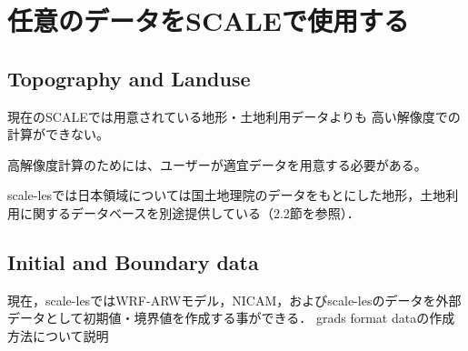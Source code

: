 \section{任意のデータをSCALEで使用する}

\subsection{Topography and Landuse}

現在のSCALEでは用意されている地形・土地利用データよりも
高い解像度での計算ができない。

高解像度計算のためには、ユーザーが適宜データを用意する必要がある。


scale-lesでは日本領域については国土地理院のデータをもとにした地形，土地利用に関するデータベースを別途提供している（2.2節を参照）．





\subsection{Initial and Boundary data}
\label{sec:adv_bnddata}

現在，scale-lesではWRF-ARWモデル，NICAM，およびscale-lesのデータを外部データとして初期値・境界値を作成する事ができる．
grads format dataの作成方法について説明
